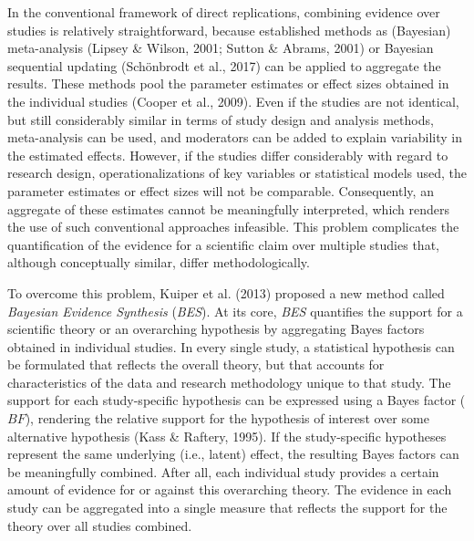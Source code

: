 \documentclass[
]{interact}
\begin{document}
In the conventional framework of direct replications, combining evidence
over studies is relatively straightforward, because established methods
as (Bayesian) meta-analysis (Lipsey \& Wilson, 2001; Sutton \& Abrams,
2001) or Bayesian sequential updating (Schönbrodt et al., 2017) can be
applied to aggregate the results. These methods pool the parameter
estimates or effect sizes obtained in the individual studies (Cooper et
al., 2009). Even if the studies are not identical, but still
considerably similar in terms of study design and analysis methods,
meta-analysis can be used, and moderators can be added to explain
variability in the estimated effects. However, if the studies differ
considerably with regard to research design, operationalizations of key
variables or statistical models used, the parameter estimates or effect
sizes will not be comparable. Consequently, an aggregate of these
estimates cannot be meaningfully interpreted, which renders the use of
such conventional approaches infeasible. This problem complicates the
quantification of the evidence for a scientific claim over multiple
studies that, although conceptually similar, differ methodologically.

To overcome this problem, Kuiper et al. (2013) proposed a new method
called \emph{Bayesian Evidence Synthesis} (\emph{BES}). At its core,
\emph{BES} quantifies the support for a scientific theory or an
overarching hypothesis by aggregating Bayes factors obtained in
individual studies. In every single study, a statistical hypothesis can
be formulated that reflects the overall theory, but that accounts for
characteristics of the data and research methodology unique to that
study. The support for each study-specific hypothesis can be expressed
using a Bayes factor (\(BF\)), rendering the relative support for the
hypothesis of interest over some alternative hypothesis (Kass \&
Raftery, 1995). If the study-specific hypotheses represent the same
underlying (i.e., latent) effect, the resulting Bayes factors can be
meaningfully combined. After all, each individual study provides a
certain amount of evidence for or against this overarching theory. The
evidence in each study can be aggregated into a single measure that
reflects the support for the theory over all studies combined.
\end{document}
